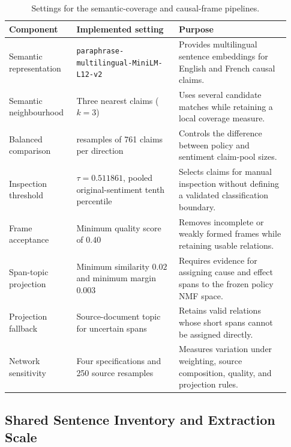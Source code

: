 \begin{table}[!htbp]
\centering
\scriptsize
\setlength{\tabcolsep}{3.5pt}
\renewcommand{\arraystretch}{1.06}
\begin{tabular}{
>{\raggedright\arraybackslash}p{0.22\linewidth}
>{\raggedright\arraybackslash}p{0.34\linewidth}
>{\raggedright\arraybackslash}p{0.37\linewidth}
}
\hline
Component & Implemented setting & Purpose \\
\hline
Semantic representation &
\texttt{paraphrase-multilingual-MiniLM-L12-v2} &
Provides multilingual sentence embeddings for English and French causal claims. \\

Semantic neighbourhood &
Three nearest claims ($k=3$) &
Uses several candidate matches while retaining a local coverage measure. \\

Balanced comparison &
50 resamples of 761 claims per direction &
Controls the difference between policy and sentiment claim-pool sizes. \\

Inspection threshold &
$\tau=0.511861$, pooled original-sentiment tenth percentile &
Selects claims for manual inspection without defining a validated classification
boundary. \\

Frame acceptance &
Minimum quality score of $0.40$ &
Removes incomplete or weakly formed frames while retaining usable relations. \\

Span-topic projection &
Minimum similarity $0.02$ and minimum margin $0.003$ &
Requires evidence for assigning cause and effect spans to the frozen policy NMF
space. \\

Projection fallback &
Source-document topic for uncertain spans &
Retains valid relations whose short spans cannot be assigned directly. \\

Network sensitivity &
Four specifications and 250 source resamples &
Measures variation under weighting, source composition, quality, and projection rules.\\
\hline
\end{tabular}
\caption{Settings for the semantic-coverage and causal-frame pipelines.}
\label{tab:impl-causal-settings}
\end{table}

\subsection{Shared Sentence Inventory and Extraction Scale}
\label{subsec:impl-causal-inventory}

